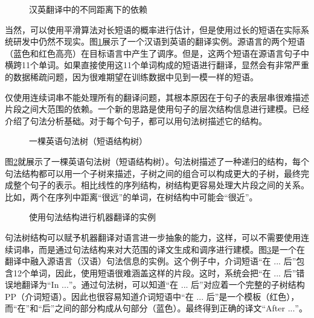 \begin{figure}[htp]
\centering

\caption{汉英翻译中的不同距离下的依赖}
\label{fig:8-1}
\end{figure}

\parinterval 当然，可以使用平滑算法对长短语的概率进行估计，但是使用过长的短语在实际系统研发中仍然不现实。图\ref{fig:8-1}展示了一个汉语到英语的翻译实例。源语言的两个短语（蓝色和红色高亮）在目标语言中产生了调序。但是，这两个短语在源语言句子中横跨11个单词。如果直接使用这11个单词构成的短语进行翻译，显然会有非常严重的数据稀疏问题，因为很难期望在训练数据中见到一模一样的短语。

\parinterval 仅使用连续词串不能处理所有的翻译问题，其根本原因在于句子的表层串很难描述片段之间大范围的依赖。一个新的思路是使用句子的层次结构信息进行建模。{\chapterthree}已经介绍了句法分析基础。对于每个句子，都可以用句法树描述它的结构。

\begin{figure}[htp]
\centering

\caption{一棵英语句法树（短语结构树）}
\label{fig:8-2}
\end{figure}

\parinterval 图\ref{fig:8-2}就展示了一棵英语句法树（短语结构树）。句法树描述了一种递归的结构，每个句法结构都可以用一个子树来描述，子树之间的组合可以构成更大的子树，最终完成整个句子的表示。相比线性的序列结构，树结构更容易处理大片段之间的关系。比如，两个在序列中距离“很远”的单词，在树结构中可能会“很近”。

\begin{figure}[htp]
\centering

\caption{使用句法结构进行机器翻译的实例}
\label{fig:8-3}
\end{figure}

\parinterval 句法树结构可以赋予机器翻译对语言进一步抽象的能力，这样，可以不需要使用连续词串，而是通过句法结构来对大范围的译文生成和调序进行建模。图\ref{fig:8-3}是一个在翻译中融入源语言（汉语）句法信息的实例。这个例子中，介词短语“在 $...$ 后”包含12个单词，因此，使用短语很难涵盖这样的片段。这时，系统会把“在 $...$ 后”错误地翻译为“In $...$”。通过句法树，可以知道“在 $...$ 后”对应着一个完整的子树结构PP（介词短语）。因此也很容易知道介词短语中“在 $...$ 后”是一个模板（红色），而“在”和“后”之间的部分构成从句部分（蓝色）。最终得到正确的译文“After $...$”。

